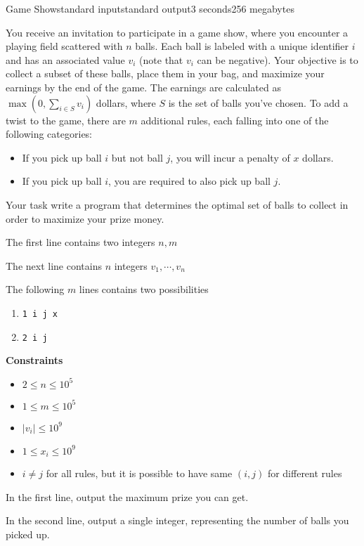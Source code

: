 \begin{problem}{Game Show}{standard input}{standard output}{3 seconds}{256 megabytes}

You receive an invitation to participate in a game show, where you encounter a playing field scattered with $n$ balls. Each ball is labeled with a unique identifier $i$ and has an associated value $v_i$ (note that $v_i$ can be negative). Your objective is to collect a subset of these balls, place them in your bag, and maximize your earnings by the end of the game. The earnings are calculated as $\max(0, \sum_{i \in S} v_i)$ dollars, where $S$ is the set of balls you've chosen. To add a twist to the game, there are $m$ additional rules, each falling into one of the following categories:
\begin{itemize}
    \item If you pick up ball $i$ but not ball $j$, you will incur a penalty of $x$ dollars.
    \item If you pick up ball $i$, you are required to also pick up ball $j$.
\end{itemize}
Your task write a program that determines the optimal set of balls to collect in order to maximize your prize money.


\InputFile
The first line contains two integers $n, m$

The next line contains $n$ integers $v_1, \cdots, v_n$

The following $m$ lines contains two possibilities
\begin{enumerate}
    \item \texttt{1 i j x}
    \item \texttt{2 i j}
\end{enumerate}

\textbf{Constraints}
\begin{itemize}
\item $2 \le n \le 10^5$
\item $1 \le m \le 10^5$
\item $|v_i| \le 10^9$
\item $1 \le x_i \le 10^9$
\item $i \ne j$ for all rules, but it is possible to have same $(i,j)$ for different rules
\end{itemize}

\OutputFile
In the first line, output the maximum prize you can get.

In the second line, output a single integer, representing the number of balls you picked up.


\end{problem}
